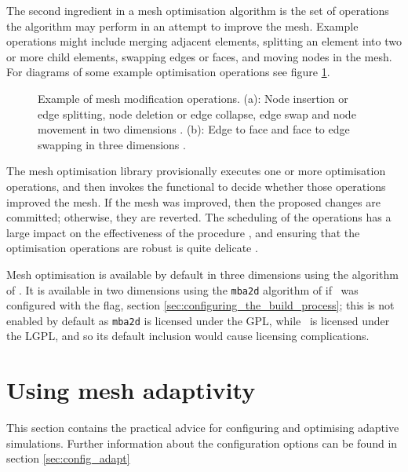 The second ingredient in a mesh optimisation algorithm is the set of operations the
algorithm may perform in an attempt to improve the mesh. Example operations might include
merging adjacent elements, splitting an element into two or more child elements, swapping
edges or faces, and moving nodes in the mesh. For diagrams of some example optimisation
operations see figure \ref{fig:edge_operations}.

\begin{figure}[h] 
\centering
{} \hspace{7mm}
\caption[Example of mesh modification operations.]{Example of mesh modification operations. (a): Node insertion or edge splitting, node deletion or edge collapse, edge swap and node movement in two dimensions \citep[2D, from][]{piggott2009}. (b): Edge to face and face to edge swapping in three dimensions \citep[3D, from][]{pain2001}.}
\label{fig:edge_operations}
\end{figure}

The mesh optimisation library provisionally executes one or more optimisation operations, and then
invokes the functional to decide whether those operations improved the mesh. If the
mesh was improved, then the proposed changes are committed; otherwise, they are reverted. The
scheduling of the operations has a large impact on the effectiveness of the procedure \citep{li2005},
and ensuring that the optimisation operations are robust is quite delicate \citep{compere2010a}.

Mesh optimisation is available by default in three dimensions using the algorithm
of \citet{pain2001}. It is available in two dimensions using the \texttt{mba2d} algorithm of
\citet{vasilevskii1999} if \fluidity\ was configured with
the  flag, section \ref{sec:configuring_the_build_process}; this is not enabled by default
as \texttt{mba2d} is licensed under the GPL, while \fluidity\ is licensed under the LGPL,
and so its default inclusion would cause licensing complications.

\section{Using mesh adaptivity} \label{sec:using_mesh_adaptivity}
This section contains the practical advice for configuring and optimising
adaptive simulations. Further information about the configuration options can be found in section \ref{sec:config_adapt}

